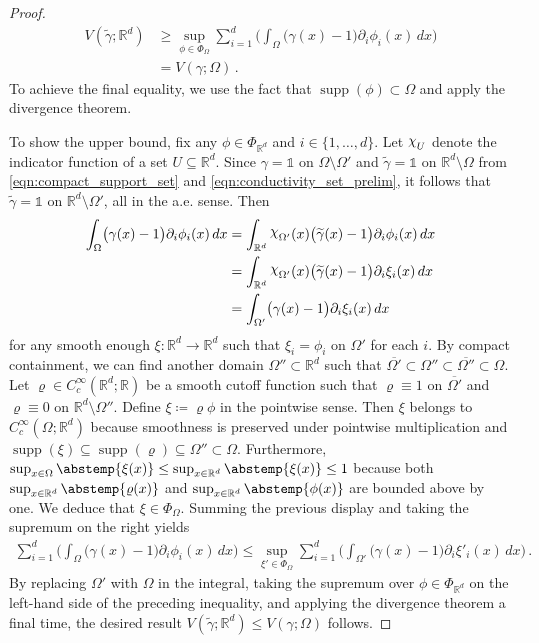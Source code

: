 \documentclass[pdflatex,sn-mathphys-num]{sn-jnl-preprint}
\newcommand{\R}{\mathbb{R}}
\newcommand{\abs}{\abstemp}
\DeclareRobustCommand{\rchi}{{\mathpalette\irchi\relax}}
\newcommand{\irchi}[2]{\raisebox{\depth}{$#1\chi$}} %
\newcommand{\defeq}{\coloneqq} %
\newcommand{\diff}{d}
\newcommand{\dd}[1]{\,\diff{#1}}
\newcommand{\onebm}{\mathds{1}} %
\DeclareMathOperator{\supp}{supp} %
\theoremstyle{thmstyleone}%
\theoremstyle{thmstyletwo}%
\theoremstyle{thmstylethree}%
\numberwithin{equation}{section}
\numberwithin{theorem}{section}
\begin{document}
\begin{appendices}
\begin{proof}
    \begin{align*}
        V(\widetilde{\gamma};\R^d)&\geq \sup_{\phi\in\Phi_{\Omega}} \sum_{i=1}^d \biggl(\int_{\Omega} \bigl(\gamma(x)-1\bigr)\partial_i\phi_i(x)\dd{x}\biggr)\\
        &= V(\gamma;\Omega)\,.
    \end{align*}
    To achieve the final equality, we use the fact that $\supp(\phi)\subset\Omega$ and apply the divergence theorem.
    
    To show the upper bound, fix any $\phi\in\Phi_{\R^d}$ and $i\in\{1,\ldots, d\}$. Let $\rchi_U$ denote the indicator function of a set $U\subseteq\R^d$. Since $\gamma=\onebm$ on $\Omega\setminus\Omega'$ and $\widetilde{\gamma}=\onebm$ on $\R^d\setminus\Omega$ from \eqref{eqn:compact_support_set} and \eqref{eqn:conductivity_set_prelim}, it follows that $\widetilde{\gamma}=\onebm$ on $\R^d\setminus\Omega'$, all in the a.e. sense. Then
    \begin{align*}
        \int_{\Omega} \bigl(\gamma(x)-1\bigr)\partial_i\phi_i(x)\dd{x}&=\int_{\R^d}\rchi_{\Omega'}(x) \bigl(\widetilde{\gamma}(x)-1\bigr)\partial_i\phi_i(x)\dd{x}\\
        &=\int_{\R^d}\rchi_{\Omega'}(x) \bigl(\widetilde{\gamma}(x)-1\bigr)\partial_i\xi_i(x)\dd{x}\\
        &=\int_{\Omega'} \bigl(\gamma(x)-1\bigr)\partial_i\xi_i(x)\dd{x}
    \end{align*}
    for any smooth enough $\xi\colon\R^d\to\R^d$ such that $\xi_i=\phi_i$ on $\Omega'$ for each $i$. By compact containment, we can find another domain $\Omega''\subset\R^d$ such that $\overline{\Omega'}\subset\Omega''\subset\overline{\Omega''}\subset\Omega$.
    Let $\varrho\in C_c^\infty(\R^d;\R)$ be a smooth cutoff function such that $\varrho \equiv 1$ on $\overline{\Omega'}$ and $\varrho\equiv 0$ on $\R^d\setminus \Omega''$. Define $\xi\defeq \varrho\phi$ in the pointwise sense. Then $\xi$ belongs to $C_c^\infty(\Omega;\R^d)$ because smoothness is preserved under pointwise multiplication and $\supp(\xi)\subseteq \supp(\varrho)\subseteq \Omega''\subset\Omega $. Furthermore, $\sup_{x\in\Omega}\abs{\xi(x)}\leq \sup_{x\in\R^d}\abs{\xi(x)}\leq 1$ because both $\sup_{x\in\R^d}\abs{\varrho(x)}$ and $\sup_{x\in\R^d}\abs{\phi(x)}$ are bounded above by one. We deduce that $\xi\in\Phi_{\Omega}$. Summing the previous display and taking the supremum on the right yields
    \begin{align*}
        \sum_{i=1}^d \biggl(\int_{\Omega} \bigl(\gamma(x)-1\bigr)\partial_i\phi_i(x)\dd{x}\biggr)\leq \sup_{\xi'\in\Phi_\Omega}\sum_{i=1}^d \biggl(\int_{\Omega'} \bigl(\gamma(x)-1\bigr)\partial_i\xi'_i(x)\dd{x}\biggr)\,.
    \end{align*}
    By replacing $\Omega'$ with $\Omega$ in the integral, taking the supremum over $\phi\in\Phi_{\R^d}$ on the left-hand side of the preceding inequality, and applying the divergence theorem a final time, the desired result $V(\widetilde{\gamma};\R^d)\leq V(\gamma;\Omega)$ follows.
\end{proof}


\end{appendices}
\end{document}

